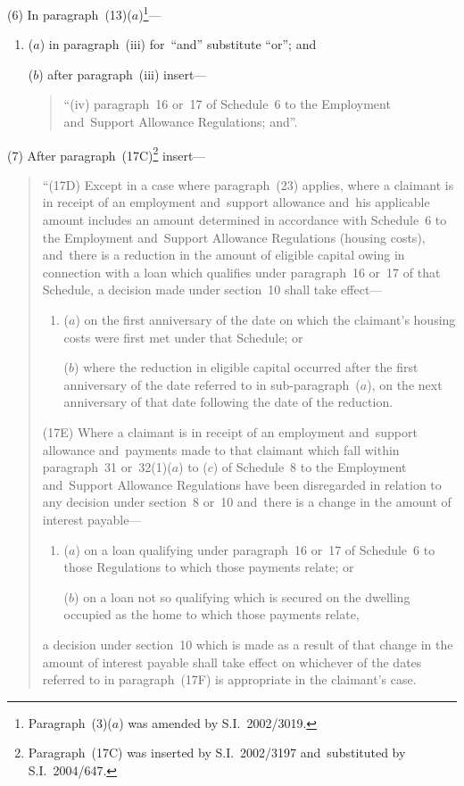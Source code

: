 \documentclass[12pt,a4paper]{article}
\begin{document}
(6) In paragraph~(13)($a$)\footnote{Paragraph~(3)($a$) was amended by S.I.~2002/3019.}—
\begin{enumerate}\item[]
($a$) in paragraph~(iii)  for~“and” substitute “or”; and

($b$) after paragraph~(iii)  insert—
\begin{quotation}
“(iv) paragraph~16 or~17 of Schedule~6 to the Employment and~Support Allowance Regulations; and”.
\end{quotation}
\end{enumerate}

(7) After paragraph~(17C)\footnote{Paragraph~(17C) was inserted by S.I.~2002/3197 and~substituted by S.I.~2004/647.} insert—
\begin{quotation}
“(17D) Except in a case where paragraph~(23) applies, where a claimant is in receipt of an employment and~support allowance and~his applicable amount includes an amount determined in accordance with Schedule~6 to the Employment and~Support Allowance Regulations (housing costs), and~there is a reduction in the amount of eligible capital owing in connection with a loan which qualifies under paragraph~16 or~17 of that Schedule, a decision made under section~10 shall take effect—
\begin{enumerate}\item[]
($a$) on the first anniversary of the date on which the claimant’s housing costs were first met under that Schedule; or

($b$) where the reduction in eligible capital occurred after the first anniversary of the date referred to in sub-paragraph~($a$), on the next anniversary of that date following the date of the reduction.
\end{enumerate}

(17E) Where a claimant is in receipt of an employment and~support allowance and~payments made to that claimant which fall within paragraph~31 or~32(1)($a$)  to ($c$)  of Schedule~8 to the Employment and~Support Allowance Regulations have been disregarded in relation to any decision under section~8 or~10 and~there is a change in the amount of interest payable—
\begin{enumerate}\item[]
($a$) on a loan qualifying under paragraph~16 or~17 of Schedule~6 to those Regulations to which those payments relate; or

($b$) on a loan not so qualifying which is secured on the dwelling occupied as the home to which those payments relate,
\end{enumerate}
a decision under section~10 which is made as a result of that change in the amount of interest payable shall take effect on whichever of the dates referred to in paragraph~(17F) is appropriate in the claimant’s case.


\end{quotation}
\end{document}
